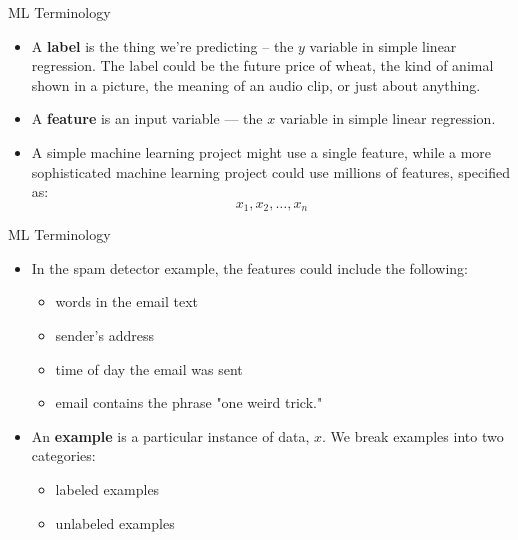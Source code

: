 \documentclass{beamer}
\begin{document}
\begin{frame}{ML Terminology}

\begin{itemize}
\item 
A {\bf label} is the thing we're predicting -- the $y$ variable in simple linear regression. The label could be the future price of wheat, the kind of animal shown in a picture, the meaning of an audio clip, or just about anything.

\item 
A {\bf feature} is an input variable — the $x$ variable in simple linear regression. 

\item A simple machine learning project might use a single feature, while a more sophisticated machine learning project could use millions of features, specified as:   
\[
x_1,x_2,\ldots,x_n
\]
\end{itemize}

\end{frame}


\begin{frame}{ML Terminology}

\begin{itemize}
\item In the spam detector example, the features could include the following:
\begin{itemize}
\item words in the email text
\item sender's address
\item time of day the email was sent
\item email contains the phrase "one weird trick."
\end{itemize}

\item An {\bf example} is a particular instance of data, $x$. We break examples into two categories:
\begin{itemize}
\item
labeled examples

\item
unlabeled examples
\end{itemize}
\end{itemize}

\end{frame}

\end{document}
